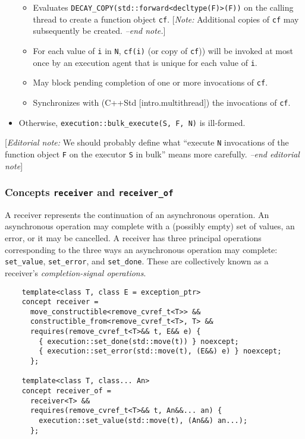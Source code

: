 \documentclass[a4paper,12pt,notitlepage,twoside,openright]{article}
\begin{document}
\begin{itemize}
  \begin{itemize}

  \item
    Evaluates
    \texttt{DECAY_COPY(std::forward<decltype(F)>(F))} on the
    calling thread to create a function object \texttt{cf}.
    {[}\emph{Note:} Additional copies of \texttt{cf} may
    subsequently be created. \emph{--end note.}{]}
  \item
    For each value of \texttt{i} in \texttt{N},
    \texttt{cf(i)} (or copy of \texttt{cf}))
    will be invoked at most once by an execution agent that is unique
    for each value of \texttt{i}.
  \item
    May block pending completion of one or more invocations of
    \texttt{cf}.
  \item
    Synchronizes with (C++Std {[}intro.multithread{]}) the invocations
    of \texttt{cf}.
  \end{itemize}
\item
  Otherwise, \texttt{execution::bulk_execute(S, F, N)} is
  ill-formed.
\end{itemize}

{[}\emph{Editorial note:} We should probably define what ``execute
\texttt{N} invocations of the function object
\texttt{F} on the executor \texttt{S} in bulk''
means more carefully. \emph{--end editorial note}{]}

\hypertarget{concepts-receiver-and-receiver_of}{%
\subsubsection{\texorpdfstring{Concepts \texttt{receiver}
and
\texttt{receiver_of}}{Concepts  and }}\label{concepts-receiver-and-receiver_of}}

A receiver represents the continuation of an asynchronous operation. An
asynchronous operation may complete with a (possibly empty) set of
values, an error, or it may be cancelled. A receiver has three principal
operations corresponding to the three ways an asynchronous operation may
complete: \texttt{set_value},
\texttt{set_error}, and \texttt{set_done}. These
are collectively known as a receiver's \emph{completion-signal
operations}.

\begin{verbatim}
    template<class T, class E = exception_ptr>
    concept receiver =
      move_constructible<remove_cvref_t<T>> &&
      constructible_from<remove_cvref_t<T>, T> &&
      requires(remove_cvref_t<T>&& t, E&& e) {
        { execution::set_done(std::move(t)) } noexcept;
        { execution::set_error(std::move(t), (E&&) e) } noexcept;
      };

    template<class T, class... An>
    concept receiver_of =
      receiver<T> &&
      requires(remove_cvref_t<T>&& t, An&&... an) {
        execution::set_value(std::move(t), (An&&) an...);
      };
\end{verbatim}
\end{document}
